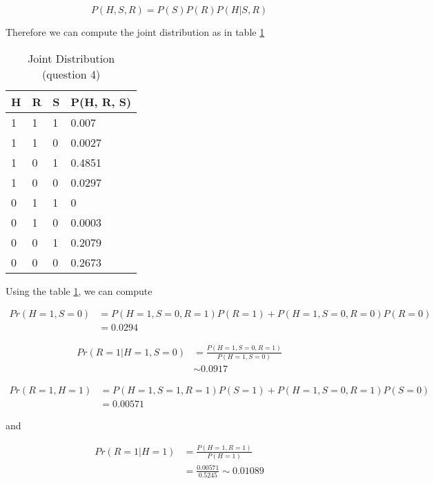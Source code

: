 \documentclass{article}
\begin{document}
\begin{equation}
P(H, S, R) = P(S)P(R)P(H|S, R)
\end{equation}

Therefore we can compute the joint distribution as in table \ref{tab:1}
\begin{table}[h!]
\begin{tabular}{l|l|l|l}
H & R & S & P(H, R, S) \\
\hline \hline
1 & 1 & 1 & 0.007      \\
\hline
1 & 1 & 0 & 0.0027     \\
\hline
1 & 0 & 1 & 0.4851     \\
\hline
1 & 0 & 0 & 0.0297     \\
\hline
0	&1	&1	&0 \\
\hline
0&	1	&0&	0.0003 \\
\hline
0	&0 &	1	& 0.2079\\
\hline
0	&0	& 0	 &0.2673 \\
\hline

\end{tabular}
\caption{Joint Distribution (question 4)}
\label{tab:1}
\end{table}

Using the table \ref{tab:1}, we can compute 

\begin{equation}
\begin{split}
Pr(H=1, S=0)&=P(H=1, S=0, R=1)P(R=1) + P(H=1, S=0, R=0)P(R=0)\\
& =0.0294
\end{split}
\end{equation}

\begin{equation}
\begin{split}
Pr(R=1|H=1, S=0)&=\frac{P(H=1, S=0, R=1)}{P(H=1, S=0)}\\
& \sim 0.0917
\end{split}
\end{equation}
 
 
 \begin{equation}
\begin{split}
Pr(R=1, H=1)&=P(H=1, S=1, R=1)P(S=1) + P(H=1, S=0, R=1)P(S=0)\\
& = 0.00571
\end{split}
\end{equation}

and 

\begin{equation}
\begin{split}
Pr(R=1|H=1)&=\frac{P(H=1, R=1)}{P(H=1)}\\
& =\frac{0.00571}{0.5245}\sim 0.01089
\end{split}
\end{equation}
\end{document}
